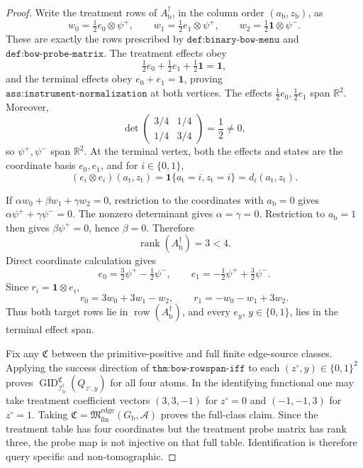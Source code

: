 \documentclass{article}
\begin{document}
\begin{proof}
Write the treatment rows of \(A_{\mathrm b}^{\dagger}\), in the column order \((a_{\mathrm b},z_{\mathrm b})\), as
\[
w_0=\tfrac12e_0\otimes\psi^+,
\qquad
w_1=\tfrac12e_1\otimes\psi^+,
\qquad
w_2=\tfrac12\mathbf 1\otimes\psi^-.
\]
These are exactly the rows prescribed by \(\texttt{def:binary-bow-menu}\) and \(\texttt{def:bow-probe-matrix}\).  The treatment effects obey
\[
\tfrac12e_0+\tfrac12e_1+\tfrac12\mathbf 1=\mathbf 1,
\]
and the terminal effects obey \(e_0+e_1=\mathbf 1\), proving \(\texttt{ass:instrument-normalization}\) at both vertices.  The effects \(\tfrac12e_0,\tfrac12e_1\) span \(\mathbb R^2\).  Moreover,
\[
\det\begin{pmatrix}3/4&1/4\\1/4&3/4\end{pmatrix}=\frac12\neq0,
\]
so \(\psi^+,\psi^-\) span \(\mathbb R^2\).  At the terminal vertex, both the effects and states are the coordinate basis \(e_0,e_1\), and for \(i\in\{0,1\}\),
\[
(e_i\otimes e_i)(a_{\mathrm t},z_{\mathrm t})
=\mathbf 1\{a_{\mathrm t}=i,z_{\mathrm t}=i\}
=d_i(a_{\mathrm t},z_{\mathrm t}).
\]

If \(\alpha w_0+\beta w_1+\gamma w_2=0\), restriction to the coordinates with \(a_{\mathrm b}=0\) gives \(\alpha\psi^++\gamma\psi^-=0\).  The nonzero determinant gives \(\alpha=\gamma=0\).  Restriction to \(a_{\mathrm b}=1\) then gives \(\beta\psi^+=0\), hence \(\beta=0\).  Therefore
\[
\operatorname{rank}(A_{\mathrm b}^{\dagger})=3<4.
\]
Direct coordinate calculation gives
\[
e_0=\tfrac32\psi^+-\tfrac12\psi^-,
\qquad
e_1=-\tfrac12\psi^++\tfrac32\psi^-.
\]
Since \(r_i=\mathbf 1\otimes e_i\),
\[
r_0=3w_0+3w_1-w_2,
\qquad
r_1=-w_0-w_1+3w_2.
\]
Thus both target rows lie in \(\operatorname{row}(A_{\mathrm b}^{\dagger})\), and every \(e_y\), \(y\in\{0,1\}\), lies in the terminal effect span.

Fix any \(\mathfrak C\) between the primitive-positive and full finite edge-source classes.  Applying the success direction of \(\texttt{thm:bow-rowspan-iff}\) to each \((z^{\circ},y)\in\{0,1\}^2\) proves \(\operatorname{GID}_{\mathcal I_{\mathrm b}^{\dagger}}^{\mathfrak C}(Q_{z^{\circ},y})\) for all four atoms.  In the identifying functional one may take treatment coefficient vectors \((3,3,-1)\) for \(z^{\circ}=0\) and \((-1,-1,3)\) for \(z^{\circ}=1\).  Taking \(\mathfrak C=\mathfrak M_{\mathrm{fin}}^{\mathrm{edge}}(G_{\mathrm b},\mathcal A)\) proves the full-class claim.  Since the treatment table has four coordinates but the treatment probe matrix has rank three, the probe map is not injective on that full table.  Identification is therefore query specific and non-tomographic.
\end{proof}
\end{document}
